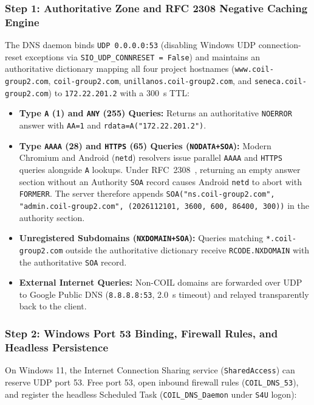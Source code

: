 \subsubsection{Step 1: Authoritative Zone and RFC 2308 Negative Caching Engine}
The DNS daemon binds \texttt{UDP 0.0.0.0:53} (disabling Windows UDP connection-reset exceptions via \texttt{SIO\_UDP\_CONNRESET = False}) and maintains an authoritative dictionary mapping all four project hostnames (\texttt{www.coil-group2.com}, \texttt{coil-group2.com}, \texttt{unillanos.coil-group2.com}, and \texttt{seneca.coil-group2.com}) to \texttt{172.22.201.2} with a \qty{300}{\second} TTL:
\begin{itemize}
    \item \textbf{Type \texttt{A} (1) and \texttt{ANY} (255) Queries:} Returns an authoritative \texttt{NOERROR} answer with \texttt{AA=1} and \texttt{rdata=A("172.22.201.2")}.
    \item \textbf{Type \texttt{AAAA} (28) and \texttt{HTTPS} (65) Queries (\texttt{NODATA+SOA}):} Modern Chromium and Android (\texttt{netd}) resolvers issue parallel \texttt{AAAA} and \texttt{HTTPS} queries alongside \texttt{A} lookups. Under RFC~2308~\cite{rfc2308}, returning an empty answer section without an Authority \texttt{SOA} record causes Android \texttt{netd} to abort with \texttt{FORMERR}. The server therefore appends \texttt{SOA("ns.coil-group2.com", "admin.coil-group2.com", (2026112101, 3600, 600, 86400, 300))} in the authority section.
    \item \textbf{Unregistered Subdomains (\texttt{NXDOMAIN+SOA}):} Queries matching \texttt{*.coil-group2.com} outside the authoritative dictionary receive \texttt{RCODE.NXDOMAIN} with the authoritative \texttt{SOA} record.
    \item \textbf{External Internet Queries:} Non-COIL domains are forwarded over UDP to Google Public DNS (\texttt{8.8.8.8:53}, \qty{2.0}{\second} timeout) and relayed transparently back to the client.
\end{itemize}

\subsubsection{Step 2: Windows Port 53 Binding, Firewall Rules, and Headless Persistence}
On Windows 11, the Internet Connection Sharing service (\texttt{SharedAccess}) can reserve UDP port 53. Free port 53, open inbound firewall rules (\texttt{COIL\_DNS\_53}), and register the headless Scheduled Task (\texttt{COIL\_DNS\_Daemon} under \texttt{S4U} logon):

